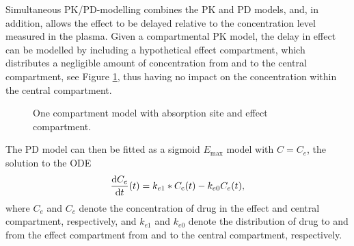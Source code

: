Simultaneous PK/PD-modelling combines the PK and PD models, and, in addition, allows the effect to be delayed relative to the concentration level measured in the plasma. Given a compartmental PK model, the delay in effect can be modelled by including a hypothetical effect compartment, which distributes a negligible amount of concentration from and to the central compartment, see Figure \ref{fig: One-compartment model with effect}, thus having no impact on the concentration within the central compartment. \begin{figure}[H]
    \centering
    \caption{One compartment model with absorption site and effect compartment.}
    \label{fig: One-compartment model with effect}
\end{figure}
The PD model can then be fitted as a sigmoid $E_{\text{max}}$ model with $C=C_e$, the solution to the ODE
\begin{align} \label{eq: Concentration in effect compartment}
    \frac{\mathrm{d} C_e}{\mathrm{d}t}(t) = k_{e1} * C_{\text{c}}(t) - k_{e0} C_e(t),
\end{align}
where $C_e$ and $C_c$ denote the concentration of drug in the effect and central compartment, respectively, and $k_{e1}$ and $k_{e0}$ denote the distribution of drug to and from the effect compartment from and to the central compartment, respectively. 

